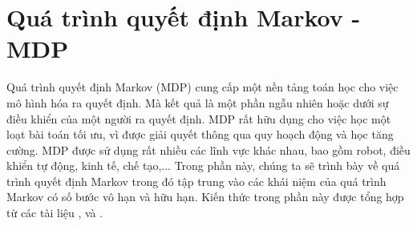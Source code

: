 \chapter{Quá trình quyết định Markov - MDP}
\label{ch:03}
Quá trình quyết định Markov (MDP) cung cấp một nền tảng toán học cho việc mô hình hóa ra quyết định. Mà kết quả là một phần ngẫu nhiên hoặc dưới sự điều khiển của một người ra quyết định. MDP rất hữu dụng cho việc học một loạt bài toán tối ưu, vì được giải quyết thông qua quy hoạch động và học tăng cường. MDP được sử dụng rất nhiều các lĩnh vực khác nhau, bao gồm robot, điều khiển tự động, kinh tế, chế tạo,... Trong phần này, chúng ta sẽ trình bày về quá trình quyết định Markov trong đó tập trung vào các khái niệm của quá trình Markov có số bước vô hạn và hữu hạn. Kiến thức trong phần này được tổng hợp từ các tài liệu \cite{Belman1957}, \cite{Sutton1999} và \cite{Puterman1994}.
